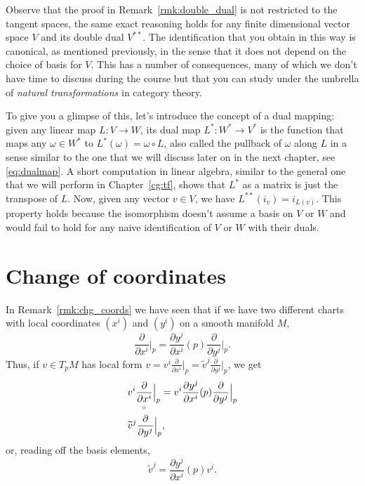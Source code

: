 \begin{remark}
	Observe that the proof in Remark~\ref{rmk:double_dual} is not restricted to the tangent spaces, the same exact reasoning holds for any finite dimensional vector space $V$ and its double dual $V^{**}$.
	The identification that you obtain in this way is canonical, as mentioned previously, in the sense that it does not depend on the choice of basis for $V$. This has a number of consequences, many of which we don't have time to discuss during the course but that you can study under the umbrella of \emph{natural transformations} in category theory.

	To give you a glimpse of this, let's introduce the concept of a dual mapping: given any linear map $L:V\to W$, its dual map $L^* : W^* \to V^*$ is the function that maps any $\omega\in W^*$ to $L^*(\omega) = \omega \circ L$, also called the pullback of $\omega$ along $L$ in a sense similar to the one that we will discuss later on in the next chapter, see \eqref{eq:dualmap}.
	A short computation in linear algebra, similar to the general one that we will perform in Chapter~\ref{cg:tf}, shows that $L^*$ as a matrix is just the transpose of $L$. Now, given any vector $v\in V$, we have $L^{**}(i_v)=i_{L(v)}$. This property holds because the isomorphism doesn't assume a basis on $V$ or $W$ and would fail to hold for any naive identification of $V$ or $W$ with their duals.
\end{remark}

\section{Change of coordinates}
In Remark~\ref{rmk:chg_coords} we have seen that if we have two different charts with local coordinates $(x^i)$ and $(y^i)$ on a smooth manifold $M$,
\begin{equation}
	\frac{\partial}{\partial x^i}\Big|_p = \frac{\partial y^j}{\partial x^i}(p) \frac{\partial}{\partial y^j}\Big|_p.
\end{equation}
Thus, if $v\in T_pM$ has local form $v = v^i \frac{\partial}{\partial x^i}\big|_p = \widetilde v^j \frac{\partial}{\partial y^j}\big|_p$, we get
\begin{align}
	 & \underset{\shortparallel}{v^i \frac{\partial}{\partial x^i}\Big|_p} = v^i \frac{\partial y^j}{\partial x^i}(p) \frac{\partial}{\partial y^j}\Big|_p \\
	 & \widetilde v^j \frac{\partial}{\partial y^j}\Big|_p,
\end{align}
or, reading off the basis elements,
\begin{equation}\label{eq:contravariant}
	\widetilde v^j = \frac{\partial y^j}{\partial x^i}(p) v^i.
\end{equation}

